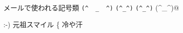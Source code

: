 \documentclass{jlreq}
\begin{document}
メールで使われる記号類 \verb*|(^  _  ^)| \verb/(^_^)/ \verb"(^_^)" \verb@(^_^)@
\begin{verbatim*}
    :-)                                                                元祖スマイル
    ^^;                                                                冷や汗
\end{verbatim*}
\end{document}
